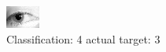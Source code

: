 \begin{figure}[h!]
\begin{center}
\includegraphics[width=0.60\columnwidth]{figures/ID1275_class_4_target_3.png}
\end{center}
\caption{ Classification: 4 actual target: 3}
\label{fig:ID1275_class_4_target_3}
\end{figure}
